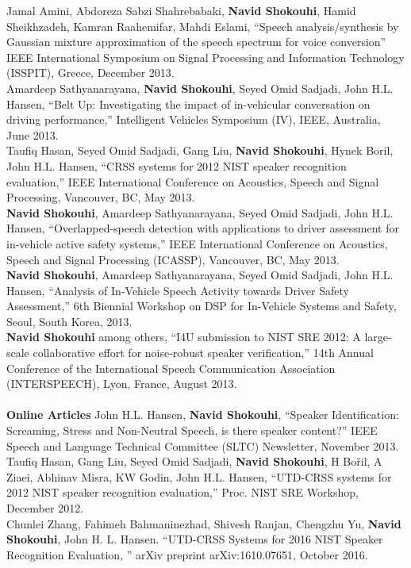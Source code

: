 	Jamal Amini, Abdoreza Sabzi Shahrebabaki, {\bf Navid Shokouhi}, Hamid Sheikhzadeh, Kamran Raahemifar, Mahdi Eslami,  ``Speech analysis/synthesis by Gaussian mixture approximation of the speech spectrum for voice conversion'' IEEE International Symposium on Signal Processing and Information Technology (ISSPIT), Greece, December 2013.\\
	
	Amardeep Sathyanarayana, {\bf Navid Shokouhi}, Seyed Omid Sadjadi, John H.L. Hansen, ``Belt Up: Investigating the impact of in-vehicular conversation on driving performance,'' Intelligent Vehicles Symposium (IV), IEEE, Australia, June 2013. \\
	
	Taufiq Hasan, Seyed Omid Sadjadi, Gang Liu, {\bf Navid Shokouhi}, Hynek Boril, John H.L. Hansen, ``CRSS systems for 2012 NIST speaker recognition evaluation,'' IEEE International Conference on Acoustics, Speech and Signal Processing, Vancouver, BC, May 2013. \\
	
	{\bf Navid Shokouhi}, Amardeep Sathyanarayana, Seyed Omid Sadjadi, John H.L. Hansen, ``Overlapped-speech detection with applications to driver assessment for in-vehicle active safety systems,'' IEEE International Conference on Acoustics, Speech and Signal Processing (ICASSP), Vancouver, BC, May 2013. \\
	
	{\bf Navid Shokouhi}, Amardeep Sathyanarayana, Seyed Omid Sadjadi, John H.L. Hansen, ``Analysis of In-Vehicle Speech Activity towards Driver Safety Assessment,'' 6th Biennial Workshop on DSP for In-Vehicle Systems and Safety, Seoul, South Korea, 2013.\\
	
	{\bf Navid Shokouhi} among others, ``I4U submission to NIST SRE 2012: A large-scale collaborative effort for noise-robust speaker verification,'' 14th Annual Conference of the International Speech Communication Association (INTERSPEECH), Lyon, France, August 2013.\\\\
	
	\textbf{\sc Online Articles}
	John H.L. Hansen, {\bf Navid Shokouhi}, ``Speaker Identification: Screaming, Stress and Non-Neutral Speech, is there speaker content?'' IEEE Speech and Language Technical Committee (SLTC) Newsletter, November 2013.\\
	
	Taufiq Hasan, Gang Liu, Seyed Omid Sadjadi, {\bf Navid Shokouhi}, H Bořil, A Ziaei, Abhinav Misra, KW Godin, John H.L. Hansen, ``UTD-CRSS systems for 2012 NIST speaker recognition evaluation,'' Proc. NIST SRE Workshop, December 2012. \\
	
	Chunlei Zhang, Fahimeh Bahmaninezhad, Shivesh Ranjan, Chengzhu Yu, {\bf Navid Shokouhi}, John H. L. Hansen. ``UTD-CRSS Systems for 2016 NIST Speaker Recognition Evaluation, '' arXiv preprint arXiv:1610.07651, October 2016. 
	
	